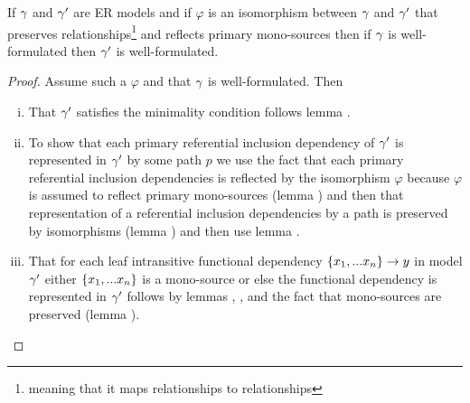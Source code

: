 \begin{lemma}
If $\gamma$ and $\gamma'$ are ER models and  if  $\varphi$ is an isomorphism between $\gamma$  and $\gamma'$ that preserves relationships\footnote{meaning that it maps relationships to relationships} and reflects primary mono-sources then if $\gamma$ is well-formulated then $\gamma'$ is well-formulated.
\end{lemma}
\begin{proof}
Assume such a $\varphi$ and that $\gamma$ is well-formulated. Then
\begin{enumerate} [(i)]
\item{
That $\gamma'$ satisfies the minimality condition follows lemma .
}
\item{ 
To show that each primary referential inclusion dependency of $\gamma'$ is represented in $\gamma'$ by some path $p$ we use the fact that each primary referential inclusion dependencies is reflected
by the isomorphism $\varphi$ because $\varphi$ is assumed to reflect primary mono-sources (lemma ) and then that representation of a referential inclusion dependencies by a path is  preserved by isomorphisms (lemma )
and then use lemma .
}
\item{
That for each leaf intransitive functional dependency $\left\{x_1,...x_n\right\} \rightarrow y$ in model $\gamma'$
either $\left\{x_1,...x_n\right\}$ is a mono-source 
or else the functional dependency is represented in $\gamma'$ 
follows by lemmas , ,
 and the fact that mono-sources are preserved (lemma ).
}
\end{enumerate}
\end{proof}
